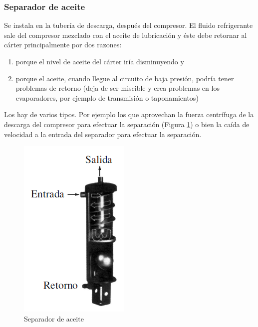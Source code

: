 \subsubsection{Separador de aceite}

Se instala en la tubería de descarga, después del compresor. El fluido refrigerante sale del compresor mezclado con el aceite de lubricación y éste debe retornar al cárter principalmente por dos razones:

\begin{enumerate}
	[1.]
	\item  porque el nivel de aceite del cárter iría disminuyendo y
	\item porque el aceite, cuando llegue al circuito de baja presión, podría tener problemas de retorno (deja de ser miscible y crea problemas en los evaporadores, por ejemplo de transmisión o taponamientos)
\end{enumerate}

Los hay de varios tipos. Por ejemplo los que aprovechan la fuerza centrífuga de la descarga del compresor para efectuar la separación (Figura \ref{fig:Separador de aceite}) o bien la caída de velocidad a la entrada del separador para efectuar la separación.

\begin{figure}
	\centering
	\includegraphics[width=.5\linewidth]{figuras/separador de aceite.png}
	\caption{Separador de aceite}
	\label{fig:Separador de aceite}
\end{figure}  

